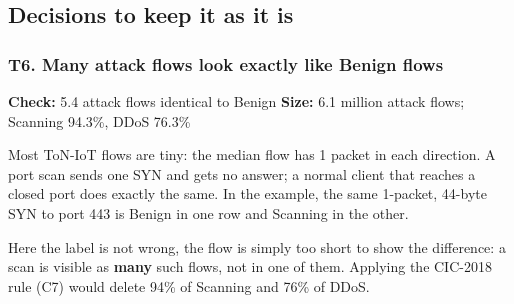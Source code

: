 \documentclass[10pt,a4paper]{article}
\newcommand{\meta}[2]{{\small\color{muted}\textbf{Check:} #1 \quad\textbar\quad \textbf{Size:} #2}}
\newenvironment{problem}{\par\noindent\begin{minipage}{\linewidth}\setlength{\parskip}{4pt}}{\end{minipage}\par\bigskip}
\begin{document}
\subsection{Decisions to keep it as it is}
\begin{problem}
\subsubsection*{T6. Many attack flows look exactly like Benign flows}
\meta{5.4 attack flows identical to Benign}{6.1 million attack flows; Scanning 94.3\%, DDoS 76.3\%}

Most ToN-IoT flows are tiny: the median flow has 1 packet in each direction. A port scan sends one SYN and gets no answer; a normal client that reaches a closed port does exactly the same. In the example, the same 1-packet, 44-byte SYN to port 443 is Benign in one row and Scanning in the other.

Here the label is not wrong, the flow is simply too short to show the difference: a scan is visible as \textbf{many} such flows, not in one of them. Applying the CIC-2018 rule (C7) would delete 94\% of Scanning and 76\% of DDoS.


\end{problem}
\end{document}
